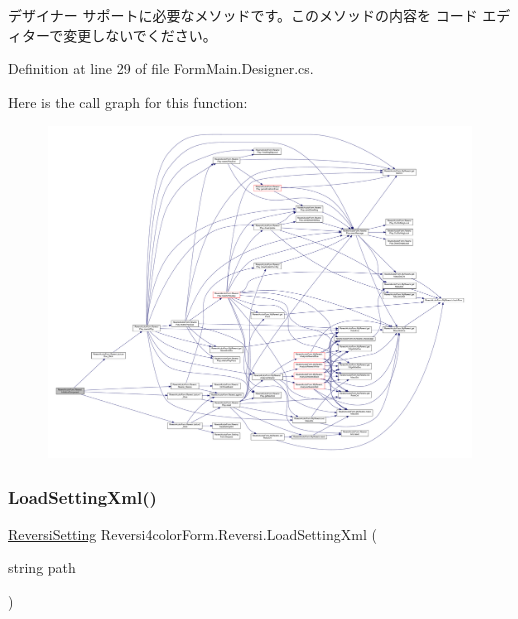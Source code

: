 デザイナー サポートに必要なメソッドです。このメソッドの内容を コード エディターで変更しないでください。 



Definition at line 29 of file Form\+Main.\+Designer.\+cs.

Here is the call graph for this function\+:
\nopagebreak
\begin{figure}[H]
\begin{center}
\leavevmode
\includegraphics[width=350pt]{class_reversi4color_form_1_1_reversi_a9eb7787e255c6aab7c75d6f0730e579e_cgraph}
\end{center}
\end{figure}
\mbox{\label{class_reversi4color_form_1_1_reversi_a944e9618d0eac2a6928d8a8ec835d384}} 
\subsubsection{\texorpdfstring{Load\+Setting\+Xml()}{LoadSettingXml()}}
{\footnotesize\ttfamily \hyperlink{class_reversi4color_form_1_1_reversi_setting}{Reversi\+Setting} Reversi4color\+Form.\+Reversi.\+Load\+Setting\+Xml (\begin{DoxyParamCaption}\item[{string}]{path }\end{DoxyParamCaption})}



